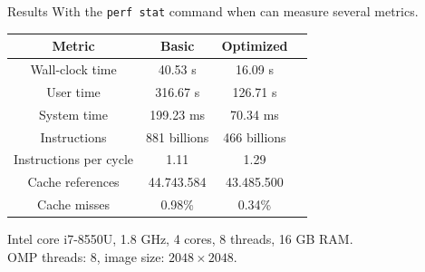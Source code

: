 %
%
\begin{frame}[fragile,t]{Results}
    With the \texttt{perf stat} command when can measure several metrics. \\ 
    \begin{table}[H]
        \centering
        \begin{tabular}{cccc}
            \toprule
            \textbf{Metric} & \textbf{Basic} & \textbf{Optimized}\\
            \midrule
            Wall-clock time & 40.53 s & 16.09 s \\
            User time & 316.67 s & 126.71 s \\
            System time & 199.23 ms & 70.34 ms \\
            \hline
            Instructions & 881 billions & 466 billions \\
            Instructions per cycle & 1.11 & 1.29 \\
            \hline
            Cache references & 44.743.584 & 43.485.500 \\
            Cache misses & 0.98\% & 0.34\% \\
            \bottomrule
        \end{tabular}
    \end{table}
    \vfill
    Intel core i7-8550U, 1.8 GHz, 4 cores, 8 threads, 16 GB RAM. \\
    OMP threads: $8$, image size: $2048 \times 2048$.
\end{frame}

